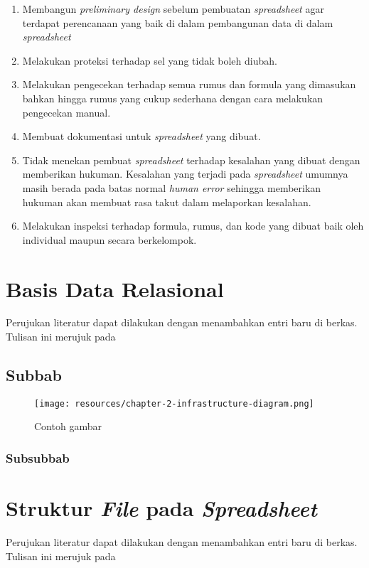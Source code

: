     \begin{enumerate}
        \item Membangun \textit{preliminary design} sebelum pembuatan \textit{spreadsheet} agar terdapat perencanaan yang baik di dalam pembangunan data di dalam \textit{spreadsheet}
        \item Melakukan proteksi terhadap sel yang tidak boleh diubah.
        \item Melakukan pengecekan terhadap semua rumus dan formula yang dimasukan bahkan hingga rumus yang cukup sederhana dengan cara melakukan pengecekan manual.
        \item Membuat dokumentasi untuk \textit{spreadsheet} yang dibuat.
        \item Tidak menekan pembuat \textit{spreadsheet} terhadap kesalahan yang dibuat dengan memberikan hukuman. Kesalahan yang terjadi pada \textit{spreadsheet} umumnya masih berada pada batas normal \textit{human error} sehingga memberikan hukuman akan membuat rasa takut dalam melaporkan kesalahan.
        \item Melakukan inspeksi terhadap formula, rumus, dan kode yang dibuat baik oleh individual maupun secara berkelompok.
    \end{enumerate}

\section{Basis Data Relasional}
Perujukan literatur \parencite{knuth2008art} dapat dilakukan dengan menambahkan entri baru di berkas. Tulisan ini merujuk pada \parencite{knuth2001art}

    \subsection{Subbab}

    \blindtext

    \begin{figure}[h]
        \centering
        \texttt{[image: resources/chapter-2-infrastructure-diagram.png]}
        \caption{Contoh gambar}
    \end{figure}

    \subsubsection{Subsubbab}

    \blindtext

\section{Struktur \textit{File} pada \textit{Spreadsheet}}
Perujukan literatur \parencite{knuth2008art} dapat dilakukan dengan menambahkan entri baru di berkas. Tulisan ini merujuk pada \parencite{knuth2001art}

